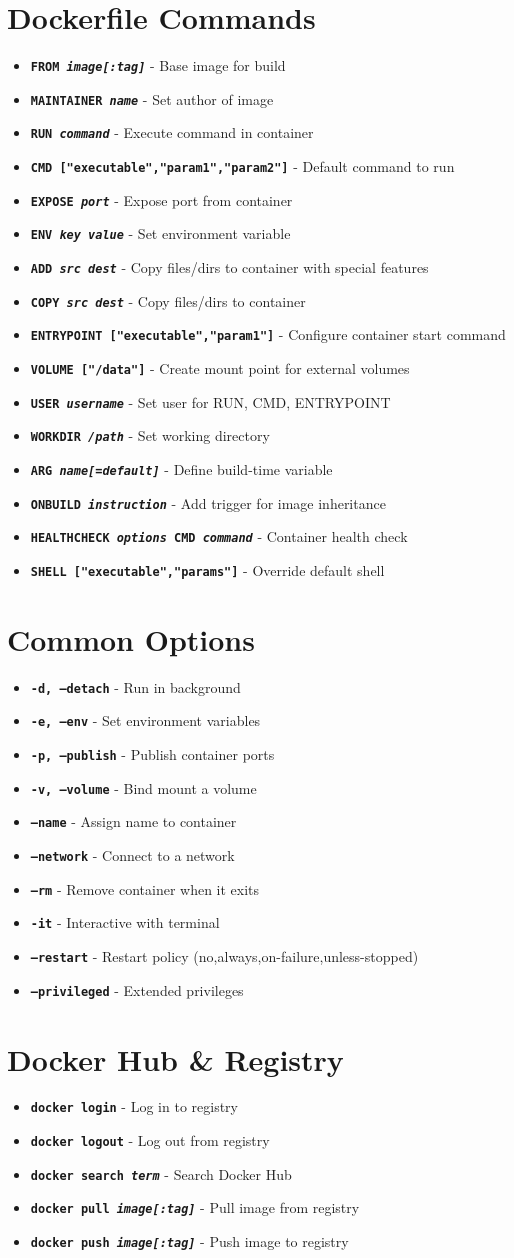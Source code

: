 \documentclass[10pt]{article}
\newcommand{\cmd}[1]{\texttt{#1}}
\newcommand{\dockitem}[2]{\item \textbf{\cmd{#1}} - #2}
\begin{document}
\begin{multicols}{2}
\section{Dockerfile Commands}
\begin{itemize}[leftmargin=*,noitemsep]
\dockitem{FROM \textit{image[:tag]}}{Base image for build}
\dockitem{MAINTAINER \textit{name}}{Set author of image}
\dockitem{RUN \textit{command}}{Execute command in container}
\dockitem{CMD ["executable","param1","param2"]}{Default command to run}
\dockitem{EXPOSE \textit{port}}{Expose port from container}
\dockitem{ENV \textit{key value}}{Set environment variable}
\dockitem{ADD \textit{src dest}}{Copy files/dirs to container with special features}
\dockitem{COPY \textit{src dest}}{Copy files/dirs to container}
\dockitem{ENTRYPOINT ["executable","param1"]}{Configure container start command}
\dockitem{VOLUME ["/data"]}{Create mount point for external volumes}
\dockitem{USER \textit{username}}{Set user for RUN, CMD, ENTRYPOINT}
\dockitem{WORKDIR \textit{/path}}{Set working directory}
\dockitem{ARG \textit{name[=default]}}{Define build-time variable}
\dockitem{ONBUILD \textit{instruction}}{Add trigger for image inheritance}
\dockitem{HEALTHCHECK \textit{options} CMD \textit{command}}{Container health check}
\dockitem{SHELL ["executable","params"]}{Override default shell}
\end{itemize}

\section{Common Options}
\begin{itemize}[leftmargin=*,noitemsep]
\dockitem{-d, --detach}{Run in background}
\dockitem{-e, --env}{Set environment variables}
\dockitem{-p, --publish}{Publish container ports}
\dockitem{-v, --volume}{Bind mount a volume}
\dockitem{--name}{Assign name to container}
\dockitem{--network}{Connect to a network}
\dockitem{--rm}{Remove container when it exits}
\dockitem{-it}{Interactive with terminal}
\dockitem{--restart}{Restart policy (no,always,on-failure,unless-stopped)}
\dockitem{--privileged}{Extended privileges}
\end{itemize}

\section{Docker Hub \& Registry}
\begin{itemize}[leftmargin=*,noitemsep]
\dockitem{docker login}{Log in to registry}
\dockitem{docker logout}{Log out from registry}
\dockitem{docker search \textit{term}}{Search Docker Hub}
\dockitem{docker pull \textit{image[:tag]}}{Pull image from registry}
\dockitem{docker push \textit{image[:tag]}}{Push image to registry}
\end{itemize}


\end{multicols}
\end{document}

